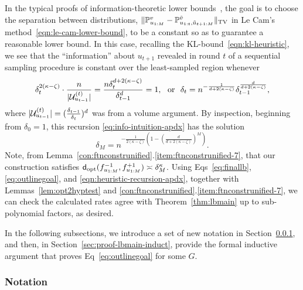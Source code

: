 In the typical proofs of
information-theoretic lower
bounds~\citep{Tsybakov09,AgarwalBaRaWa12,Duchi17}, the goal is to choose the
separation between distributions, $\tvnorms{\probuv - \probuvtildetpone}$ in Le Cam's
method~\eqref{eqn:le-cam-lower-bound}, to be a constant so as to guarantee a
reasonable lower bound. In this case, recalling the
KL-bound~\eqref{eqn:kl-heuristic}, we see that the ``information'' about $u_{t+1}$ revealed
in round $t$ of a sequential sampling procedure is constant over the
least-sampled region whenever
\begin{equation}
\label{eq:info-intuition-apdx}
\delta_t^{2(\kappa-\zeta)} \cdot \frac{n}{|\mathcal{U}^{({t})}_{u_{t-1}}|} = 
\frac{n \delta_t^{d+2(\kappa-\zeta)}}{\delta_{t-1}^d} = 1,
~~ \mbox{or} ~~
\delta_t = n^{-\frac{1}{d+2(\kappa-\zeta)}} \delta_{t-1}^\frac{d}{d + 2(\kappa-\zeta)},
\end{equation}
where $|\mathcal{U}^{({t})}_{u_{t-1}}| = (\frac{\delta_{t-1}}{\delta_{t}})^d$ was from a volume argument.
By inspection, beginning from $\delta_0 = 1$, this recursion \eqref{eq:info-intuition-apdx} has the
solution
\begin{equation}
\delta_M = n^{-\frac{1}{2(\kappa-\zeta)} \left(1 - \left(\frac{d}{d + 2(\kappa-\zeta)}\right)^M
	\right)}.
\label{eqn:heuristic-recursion-apdx}
\end{equation}
Note, from Lemma~\ref{con:ftnconstrunified}.\ref{item:ftnconstrunified-7}, that 
our construction satisfies $\fndist(\ftnuvm,\ftnuvp) \asymp \delta_M^\kappa$. 
Using Eqs~\eqref{eq:finallb}, \eqref{eq:outlinegoal}, and \eqref{eqn:heuristic-recursion-apdx}, together with Lemmas~\ref{lem:opt2hyptest} and \ref{con:ftnconstrunified}.\ref{item:ftnconstrunified-7}, we can check the calculated rates agree with Theorem~\ref{thm:lbmain} up to sub-polynomial factors, as desired.

In the following subsections, we introduce a set of new notation in Section~\ref{sec:proof-lbmain-notation}, and then, in Section~\ref{sec:proof-lbmain-induct}, provide the formal inductive argument that proves Eq~\eqref{eq:outlinegoal} for some $G$.%

\subsubsection{Notation}
\label{sec:proof-lbmain-notation}
%

